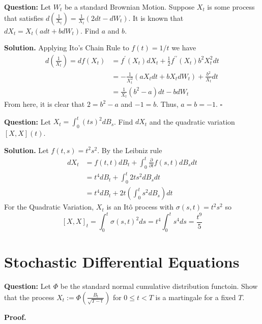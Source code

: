 \documentclass{article}
\begin{document}
\begin{tcolorbox}[colframe=black,colback=gray!5,boxrule=0.5pt]
\textbf{Question:} Let $W_t$ be a standard Brownian Motion. Suppose $X_t$ is some process that satisfies $d(\frac{1}{X_t}) = \frac{1}{X_t}(2dt-dW_t)$. It is known that $dX_t = X_t(adt + bdW_t)$. Find $a$ and $b$.
\end{tcolorbox}
\textbf{Solution.} Applying Ito's Chain Rule to $f(t) = 1/t$ we have 
\begin{align*}
    d\left(\frac{1}{X_t}\right) = df(X_t) &=  f^\prime(X_t)dX_t + \frac{1}{2}f^{\prime\prime}(X_t)b^2X_t^2dt \\
    &= -\frac{1}{X_t^2}(aX_tdt + bX_tdW_t) + \frac{b^2}{X_t}dt \\
&= \frac{1}{X_t}(b^2-a)dt-bdW_t
\end{align*}
From here, it is clear that $2 = b^2-a$ and $-1 = b$. Thus, $a=b=-1$. $\square$

\begin{tcolorbox}[colframe=black,colback=gray!5,boxrule=0.5pt]
\textbf{Question:} Let $X_t = \int_0^t (ts)^2dB_s$. Find $dX_t$ and the quadratic variation $[X,X](t)$.
\end{tcolorbox}
\textbf{Solution.} Let $f(t,s) = t^2s^2$. By the Leibniz rule 
\begin{align*}
    dX_t &= f(t,t)dB_t + \int_0^t \frac{\partial}{\partial t}f(s,t) dB_sdt  \\
         &= t^4dB_t + \int_0^t 2ts^2dB_sdt \\
         &= t^4dB_t + 2t \left(\int_0^t s^2dB_s\right)dt
\end{align*}
For the Quadratic Variation, $X_t$ is an Itô process with $\sigma(s,t) = t^2 s^2$ so
$$[X,X]_t = \int_0^t \sigma(s,t)^2 ds = t^4\int_0^t s^4ds = \frac{t^9}{5}$$


\newpage
\section{Stochastic Differential Equations}

\begin{tcolorbox}[colframe=black,colback=gray!5,boxrule=0.5pt]
\textbf{Question:} Let $\Phi$ be the standard normal cumulative distribution functoin. Show that the process $X_t := \Phi(\frac{B_t}{\sqrt{T-t}})$ for $0\leq t<T$ is a martingale for a fixed $T$.
\end{tcolorbox}
\textbf{Proof.}
\end{document}
